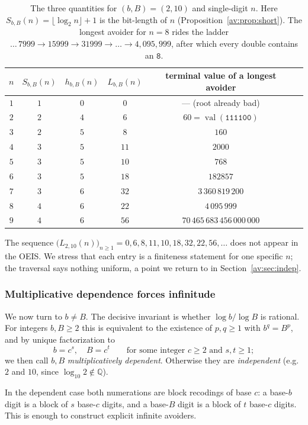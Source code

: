 \documentclass[a4paper]{article}
\theoremstyle{plain}
\theoremstyle{definition}
\theoremstyle{remark}
\DeclareMathOperator{\val}{val}
\newcommand{\QQ}{\mathbb{Q}}
\newcommand{\Lbb}[1][b,B]{L_{#1}}
\newcommand{\Sbb}[1][b,B]{S_{#1}}
\newcommand{\hbb}[1][b,B]{h_{#1}}
\begin{document}
\begin{table}[h]
\centering
\begin{tabular}{cccccl}
\toprule
$n$ & $\Sbb(n)$ & $\hbb(n)$ & $\Lbb(n)$ & terminal value of a longest avoider \\
\midrule
$1$ & $1$ & $0$  & $0$  & --- (root already bad) \\
$2$ & $2$ & $4$  & $6$  & $60=\val(\texttt{111100})$ \\
$3$ & $2$ & $5$  & $8$  & $160$ \\
$4$ & $3$ & $5$  & $11$ & $2000$ \\
$5$ & $3$ & $5$  & $10$ & $768$ \\
$6$ & $3$ & $5$  & $18$ & $182857$ \\
$7$ & $3$ & $6$  & $32$ & $3\,360\,819\,200$ \\
$8$ & $4$ & $6$  & $22$ & $4\,095\,999$ \\
$9$ & $4$ & $6$  & $56$ & $70\,465\,683\,456\,000\,000$ \\
\bottomrule
\end{tabular}
\caption{The three quantities for $(b,B)=(2,10)$ and single-digit $n$. Here $\Sbb(n)=\lfloor\log_2 n\rfloor+1$ is the bit-length of $n$ (Proposition~\ref{av:prop:short}). The longest avoider for $n=8$ rides the ladder $\dots\,7999\to15999\to31999\to\dots\to4{,}095{,}999$, after which every double contains an $\texttt{8}$.}
\label{av:tab:2-10}
\end{table}

The sequence $\bigl(\Lbb[2,10](n)\bigr)_{n\ge1}=0,6,8,11,10,18,32,22,56,\dots$ does not appear in the OEIS. We stress that each entry is a finiteness statement for one specific $n$; the traversal says nothing uniform, a point we return to in Section~\ref{av:sec:indep}.

\subsubsection{Multiplicative dependence forces infinitude}

We now turn to $b\neq B$. The decisive invariant is whether $\log b/\log B$ is rational. For integers $b,B\ge2$ this is equivalent to the existence of $p,q\ge1$ with $b^{q}=B^{p}$, and by unique factorization to
\[
b=c^{s},\quad B=c^{t}\qquad\text{for some integer }c\ge 2\text{ and }s,t\ge1;
\]
we then call $b,B$ \emph{multiplicatively dependent}. Otherwise they are \emph{independent} (e.g.\ $2$ and $10$, since $\log_{10}2\notin\QQ$).

In the dependent case both numerations are block recodings of base $c$: a base-$b$ digit is a block of $s$ base-$c$ digits, and a base-$B$ digit is a block of $t$ base-$c$ digits. This is enough to construct explicit infinite avoiders.
\end{document}
